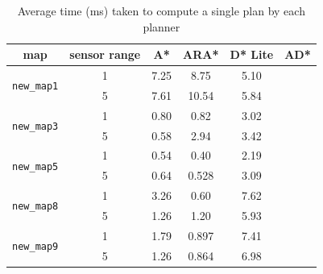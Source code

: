 \documentclass{article}
\begin{document}
\begin{table}[h]
    \centering
    \caption{Average time (ms) taken to compute a single plan by each planner}
    \begin{tabular}{|c|c|c|c|c|c|}
        \hline
        map                         &sensor range & A*    &  ARA*    & D* Lite & AD* \\
        \hline
\multirow{2}{*}{\texttt{new\_map1}} & 1           & 7.25 &    8.75   & 5.10     &     \\
                                    & 5           & 7.61 &    10.54  & 5.84     &     \\
        \hline           
\multirow{2}{*}{\texttt{new\_map3}} & 1           & 0.80 &    0.82   & 3.02     &     \\
                                    & 5           & 0.58 &    2.94   & 3.42     &     \\
        \hline
\multirow{2}{*}{\texttt{new\_map5}} & 1           & 0.54 &  0.40     & 2.19     &     \\
                                    & 5           & 0.64 &  0.528    & 3.09     &     \\
        \hline
\multirow{2}{*}{\texttt{new\_map8}} & 1           & 3.26 &    0.60   & 7.62     &     \\
                                    & 5           & 1.26 &    1.20   & 5.93     &     \\
        \hline
\multirow{2}{*}{\texttt{new\_map9}} & 1           & 1.79 &   0.897    & 7.41     &     \\
                                    & 5           & 1.26 &   0.864    & 6.98     &     \\
        \hline
    \end{tabular}
    \label{table:time}
\end{table}
\end{document}
